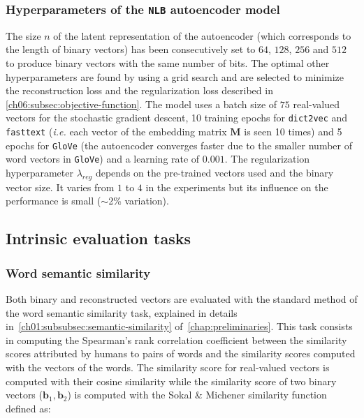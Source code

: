     \subsubsection{Hyperparameters of the \texttt{NLB} autoencoder model}
      The size $n$ of the latent representation of the autoencoder (which
      corresponds to the length of binary vectors) has been consecutively set to
      $64$, $128$, $256$ and $512$ to produce binary vectors with the same
      number of bits. The optimal other hyperparameters are found by using a
      grid search and are selected to minimize the reconstruction loss and the
      regularization loss described in \autoref{ch06:subsec:objective-function}.
      The model uses a batch size of $75$ real-valued vectors for the stochastic
      gradient descent, 10 training epochs for \texttt{dict2vec} and
      \texttt{fasttext} (\textit{i.e.} each vector of the embedding matrix
      $\mathbf{M}$ is seen 10 times) and 5 epochs for \texttt{GloVe} (the
      autoencoder converges faster due to the smaller number of word vectors in
      \texttt{GloVe}) and a learning rate of $0.001$. The regularization
      hyperparameter $\lambda_{reg}$ depends on the pre-trained vectors used and
      the binary vector size. It varies from $1$ to $4$ in the experiments but
      its influence on the performance is small ($\sim$2\% variation).

  \subsection{Intrinsic evaluation tasks}
    \label{ch06:subsec:protocol-intrinsic-tasks}
    \subsubsection{Word semantic similarity}
      Both binary and reconstructed vectors are evaluated with the standard
      method of the word semantic similarity task, explained in details
      in~\autoref{ch01:subsubsec:semantic-similarity}
      of~\autoref{chap:preliminaries}. This task consists in computing the
      Spearman's rank correlation coefficient between the similarity scores
      attributed by humans to pairs of words and the similarity scores computed
      with the vectors of the words. The similarity score for real-valued vectors
      is computed with their cosine similarity while the similarity score of
      two binary vectors ($\mathbf{b}_1, \mathbf{b}_2$) is computed with the
      Sokal \& Michener similarity function~\citep{sokal1958statistical} defined
      as:

